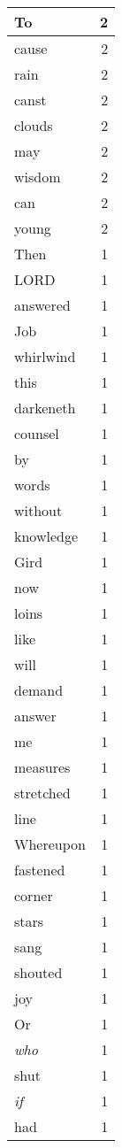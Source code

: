 \begin{center}
\begin{longtable}{l|r}
To & 2 \\ \hline
cause & 2 \\ \hline
rain & 2 \\ \hline
canst & 2 \\ \hline
clouds & 2 \\ \hline
may & 2 \\ \hline
wisdom & 2 \\ \hline
can & 2 \\ \hline
young & 2 \\ \hline
Then & 1 \\ \hline
LORD & 1 \\ \hline
answered & 1 \\ \hline
Job & 1 \\ \hline
whirlwind & 1 \\ \hline
this & 1 \\ \hline
darkeneth & 1 \\ \hline
counsel & 1 \\ \hline
by & 1 \\ \hline
words & 1 \\ \hline
without & 1 \\ \hline
knowledge & 1 \\ \hline
Gird & 1 \\ \hline
now & 1 \\ \hline
loins & 1 \\ \hline
like & 1 \\ \hline
will & 1 \\ \hline
demand & 1 \\ \hline
answer & 1 \\ \hline
me & 1 \\ \hline
measures & 1 \\ \hline
stretched & 1 \\ \hline
line & 1 \\ \hline
Whereupon & 1 \\ \hline
fastened & 1 \\ \hline
corner & 1 \\ \hline
stars & 1 \\ \hline
sang & 1 \\ \hline
shouted & 1 \\ \hline
joy & 1 \\ \hline
Or & 1 \\ \hline
\emph{who} & 1 \\ \hline
shut & 1 \\ \hline
\emph{if} & 1 \\ \hline
had & 1 \\ \hline

\end{longtable}
\end{center}
